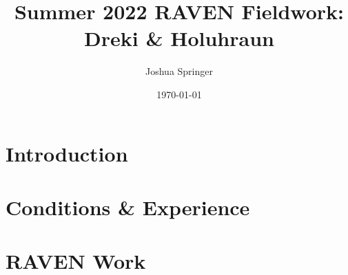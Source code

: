 \documentclass[11pt]{article}
\author{Joshua Springer}
\title{Summer 2022 RAVEN Fieldwork: Dreki \& Holuhraun}
\date{\specialdate\today}
\begin{document}
    \maketitle

    \section{Introduction}
    

    \section{Conditions \& Experience}
    

    \section{RAVEN Work}
    

%    
%    
\end{document}
